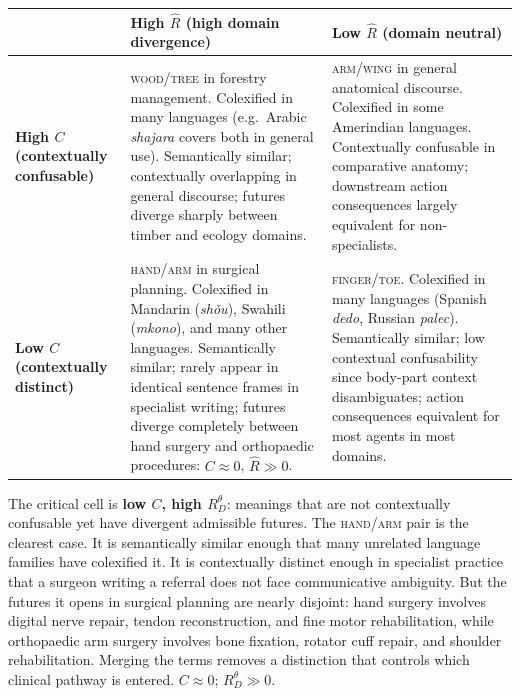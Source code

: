 \documentclass[12pt]{article}
\theoremstyle{rthm}
\theoremstyle{rdef}
\theoremstyle{remark}
\newcommand{\RD}[1][\theta]{R_{D}^{#1}}
\begin{document}
\medskip
\begin{center}
\renewcommand{\arraystretch}{1.5}
\begin{tabularx}{\textwidth}{>{\bfseries}p{2.4cm} X X}
\toprule
 & \textbf{High $\widehat{R}$ (high domain divergence)} & \textbf{Low $\widehat{R}$ (domain neutral)} \\
\midrule
\textbf{High $C$} \newline (contextually confusable) &
\textsc{wood}/\textsc{tree} in forestry management. Colexified in many languages
(e.g.\ Arabic \textit{shajara} covers both in general use). Semantically similar;
contextually overlapping in general discourse; futures diverge sharply between
timber and ecology domains. &
\textsc{arm}/\textsc{wing} in general anatomical discourse. Colexified in some
Amerindian languages. Contextually confusable in comparative anatomy; downstream
action consequences largely equivalent for non-specialists.
\\[4pt]
\textbf{Low $C$} \newline (contextually distinct) &
\textsc{hand}/\textsc{arm} in surgical planning. Colexified in Mandarin
(\textit{sh\v{o}u}), Swahili (\textit{mkono}), and many other languages.
Semantically similar; rarely appear in identical sentence frames in specialist
writing; futures diverge completely between hand surgery and orthopaedic
procedures: $C \approx 0$, $\widehat{R} \gg 0$. &
\textsc{finger}/\textsc{toe}. Colexified in many languages (Spanish
\textit{dedo}, Russian \textit{palec}). Semantically similar; low contextual
confusability since body-part context disambiguates; action consequences
equivalent for most agents in most domains.
\\
\bottomrule
\end{tabularx}
\end{center}

\medskip
The critical cell is \textbf{low $C$, high $\RD$}: meanings that are not
contextually confusable yet have divergent admissible futures. The
\textsc{hand}/\textsc{arm} pair is the clearest case. It is semantically
similar enough that many unrelated language families have colexified it.
It is contextually distinct enough in specialist practice that a surgeon
writing a referral does not face communicative ambiguity. But the futures it
opens in surgical planning are nearly disjoint: hand surgery involves digital
nerve repair, tendon reconstruction, and fine motor rehabilitation, while
orthopaedic arm surgery involves bone fixation, rotator cuff repair, and
shoulder rehabilitation. Merging the terms removes a distinction that controls
which clinical pathway is entered. $C \approx 0$; $\RD \gg 0$.
\end{document}
